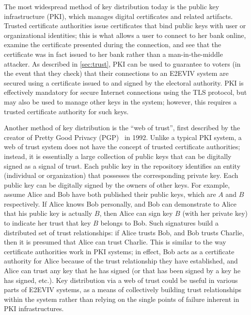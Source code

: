 \begin{itemize}
  The most widespread method of key distribution today is the public
  key infrastructure (PKI), which manages digital certificates and
  related artifacts. Trusted certificate authorities issue
  certificates that bind public keys with user or organizational
  identities; this is what allows a user to connect to her bank
  online, examine the certificate presented during the connection, and
  see that the certificate was in fact issued to her bank rather than
  a man-in-the-middle attacker. As described in \autoref{sec:trust},
  PKI can be used to guarantee to voters (in the event that they
  check) that their connections to an E2EVIV system are secured using
  a certificate issued to and signed by the electoral authority. PKI
  is effectively mandatory for secure Internet connections using the
  TLS protocol, but may also be used to manage other keys in the
  system; however, this requires a trusted certificate authority for
  such keys. 

  Another method of key distribution is the ``web of trust'', first
  described by the creator of Pretty Good Privacy
  (PGP)~\cite{Zimmermann95} in 1992. Unlike a typical PKI system, a
  web of trust system does not have the concept of trusted certificate
  authorities; instead, it is essentially a large collection of public
  keys that can be digitally signed as a signal of trust. Each public
  key in the repository identifies an entity (individual or
  organization) that possesses the corresponding private key. Each
  public key can be digitally signed by the owners of other keys. For
  example, assume Alice and Bob have both published their public keys,
  which are $A$ and $B$ respectively. If Alice knows Bob personally,
  and Bob can demonstrate to Alice that his public key is actually
  $B$, then Alice can sign key $B$ (with her private key) to indicate
  her trust that key $B$ belongs to Bob. Such signatures build a
  distributed set of trust relationships: if Alice trusts Bob, and Bob
  trusts Charlie, then it is presumed that Alice can trust
  Charlie. This is similar to the way certificate authorities work in
  PKI systems; in effect, Bob acts as a certificate authority for
  Alice because of the trust relationship they have established, and
  Alice can trust any key that he has signed (or that has been signed
  by a key he has signed, etc.). Key distribution via a web of trust
  could be useful in various parts of E2EVIV systems, as a means of
  collectively building trust relationships within the system rather
  than relying on the single points of failure inherent in PKI
  infrastructures.


\end{itemize}
